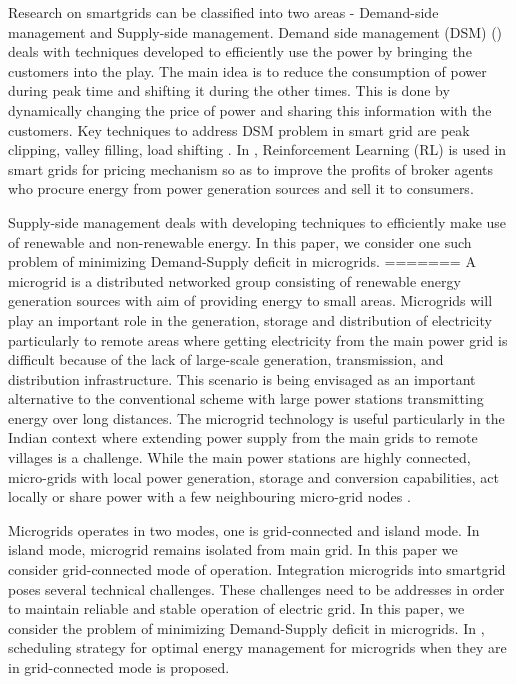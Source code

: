 \documentclass[conference]{IEEEtran}
\begin{document}
Research on smartgrids can be classified into two areas -  Demand-side management and Supply-side management. Demand side management (DSM) (\cite{logenthiran2011multi, wang2010demand,dsm1,dsm2,dsm3,dsm4}) deals with techniques developed to efficiently use the power by bringing the customers into the play. The main idea is to reduce the consumption of power during peak time and shifting it during the other times. This is done by dynamically changing the price of power and sharing this information with the customers. Key techniques to address DSM problem in smart grid are peak clipping, valley filling,  load shifting \cite{maharjan2010demand}. In \cite{reddy2011learned, reddy2011strategy}, Reinforcement Learning (RL) \cite{sutton} is used in smart grids for pricing mechanism so as to improve the profits of broker agents who procure energy from power generation sources and sell it to consumers.  

Supply-side management deals with developing techniques to efficiently make use of renewable and non-renewable energy. In this paper, we consider one such problem of minimizing Demand-Supply deficit in microgrids. 
=======
A microgrid is a distributed networked group consisting of renewable energy generation sources with aim of providing energy to small areas.  Microgrids will play an important role in the generation, storage and distribution of electricity particularly to remote areas where getting electricity from the main power grid is difficult because of the lack of large-scale generation, transmission, and distribution infrastructure. This scenario is being envisaged as an important alternative to the conventional scheme with large power stations transmitting energy over long distances. The microgrid technology is useful particularly in the Indian context where extending power supply from the main grids to remote villages is a challenge. While the main power stations are highly connected, micro-grids with local power generation, storage and conversion capabilities, act locally or share power with a few neighbouring micro-grid nodes \cite{farhangi2010path}.

Microgrids operates in two modes, one is grid-connected and island mode. In island mode, microgrid remains isolated from main grid. In this paper we consider  grid-connected mode of operation. Integration microgrids into smartgrid poses several technical challenges. These challenges need to be addresses in order to maintain reliable and stable operation of electric grid.
In this paper, we consider the problem of  minimizing Demand-Supply deficit in microgrids. In \cite{zhang2013robust}, scheduling strategy for optimal energy management for microgrids when they are in  grid-connected mode is proposed.
\end{document}
